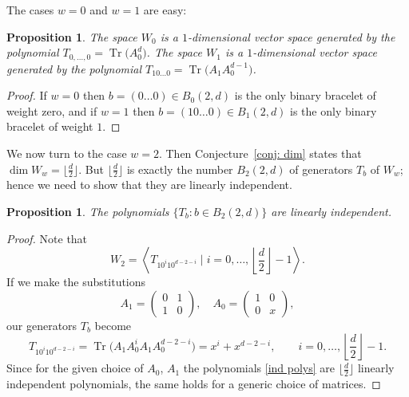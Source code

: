 \documentclass[pdftex]{sigma}
\numberwithin{equation}{section}
\newtheorem{Proposition}[Theorem]{Proposition}
\DeclareMathOperator{\Tr}{Tr}
\begin{document}
The cases $w=0$ and $w=1$ are easy:
\begin{Proposition}
	The space $W_0$ is a $1$-dimensional vector space generated by the polynomial $T_{0,\dots,0}=\Tr\big(A_{0}^d\big)$.
	The space $W_1$ is a $1$-dimensional vector space generated by the polynomial $T_{10\dots 0}=\Tr\big(A_1A_{0}^{d-1}\big)$.
\end{Proposition}
\begin{proof}
	If $w=0$ then $b=({0\dots 0})\in B_0(2,d)$ is the only binary bracelet of weight zero, and
	if $w=1$ then $b=({10\dots 0})\in B_1(2,d)$ is the only binary bracelet of weight $1$.
\end{proof}
We now turn to the case $w=2$. Then Conjecture~\ref{conj: dim} states that $\dim W_w=\big\lfloor\frac{d}{2}\big\rfloor$. But $\big\lfloor \frac{d}{2}\big\rfloor$ is exactly the number $B_2(2,d)$ of generators $T_b$ of $W_w$; hence we need to show that they are linearly independent.
\begin{Proposition}
	The polynomials $\{T_b \colon b\in B_2(2,d)
	\}$ are linearly independent.
\end{Proposition}
\begin{proof}
	Note that
\[
	W_2= \left\langle T_{10^i10^{d-2-i}} \mid i=0,\dots, \left\lfloor \frac{d}{2}\right\rfloor-1 \right\rangle.
\]
	If we make the substitutions
	\[
	A_1=
	\begin{pmatrix}
	0 & 1 \\
	1 & 0
	\end{pmatrix}, \quad
	A_0=
	\begin{pmatrix}
	1 & 0 \\
	0 & x
	\end{pmatrix},
	\]
	our generators $T_b$ become
	\begin{equation}\label{ind polys}
			T_{10^i10^{d-2-i}}=\Tr\big(A_1A_0^iA_1A_0^{d-2-i}\big)= x^i + x^{d-2-i}, \qquad i=0,\dots,\left\lfloor \frac{d}{2}\right\rfloor-1.
	\end{equation}
	Since for the given choice of $A_0$, $A_1$ the polynomials \eqref{ind polys} are $\big\lfloor \frac{d}{2}\big\rfloor$ linearly independent polynomials, the same holds for a generic choice of matrices.
\end{proof}
\end{document}
